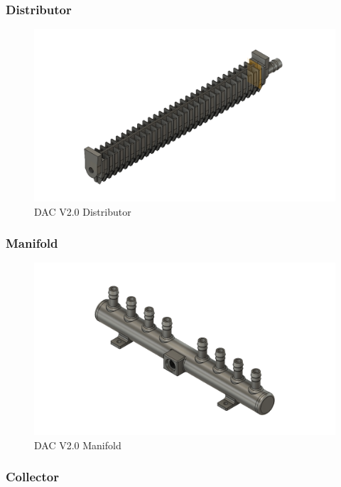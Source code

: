 \begin{appendices}
\subsubsection{Distributor}

\begin{figure}[H]
    \centering
    \includegraphics[scale = 0.4]{images/mywork/Sprint4/Distributor_main.png}
    \caption{DAC V2.0 Distributor}
    \label{fig:dacv2dis}
\end{figure}



\subsubsection{Manifold}

\begin{figure}[H]
    \centering
    \includegraphics[scale = 0.4]{images/mywork/Sprint4/Manifold_main.png}
    \caption{DAC V2.0 Manifold}
    \label{fig:dacv2mani}
\end{figure}


\subsubsection{Collector}


\end{appendices}
